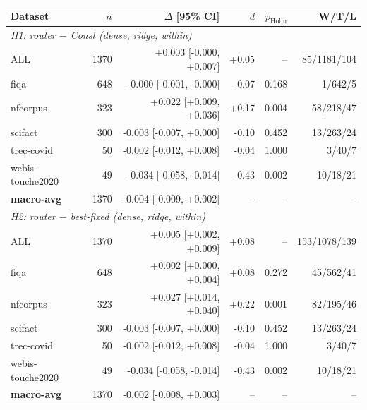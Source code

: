 \begin{tabular}{lrrrrr}
\hline
Dataset & $n$ & $\Delta$ [95\% CI] & $d$ & $p_{\mathrm{Holm}}$ & W/T/L \\
\hline
\multicolumn{6}{l}{\textit{H1: router $-$ Const (dense, ridge, within)}} \\
ALL & 1370 & +0.003 [-0.000, +0.007] & +0.05 & -- & 85/1181/104 \\
fiqa & 648 & -0.000 [-0.001, -0.000] & -0.07 & 0.168 & 1/642/5 \\
nfcorpus & 323 & +0.022 [+0.009, +0.036] & +0.17 & 0.004 & 58/218/47 \\
scifact & 300 & -0.003 [-0.007, +0.000] & -0.10 & 0.452 & 13/263/24 \\
trec-covid & 50 & -0.002 [-0.012, +0.008] & -0.04 & 1.000 & 3/40/7 \\
webis-touche2020 & 49 & -0.034 [-0.058, -0.014] & -0.43 & 0.002 & 10/18/21 \\
\textbf{macro-avg} & 1370 & -0.004 [-0.009, +0.002] & -- & -- & -- \\
\hline
\multicolumn{6}{l}{\textit{H2: router $-$ best-fixed (dense, ridge, within)}} \\
ALL & 1370 & +0.005 [+0.002, +0.009] & +0.08 & -- & 153/1078/139 \\
fiqa & 648 & +0.002 [+0.000, +0.004] & +0.08 & 0.272 & 45/562/41 \\
nfcorpus & 323 & +0.027 [+0.014, +0.040] & +0.22 & 0.001 & 82/195/46 \\
scifact & 300 & -0.003 [-0.007, +0.000] & -0.10 & 0.452 & 13/263/24 \\
trec-covid & 50 & -0.002 [-0.012, +0.008] & -0.04 & 1.000 & 3/40/7 \\
webis-touche2020 & 49 & -0.034 [-0.058, -0.014] & -0.43 & 0.002 & 10/18/21 \\
\textbf{macro-avg} & 1370 & -0.002 [-0.008, +0.003] & -- & -- & -- \\
\hline
\end{tabular}